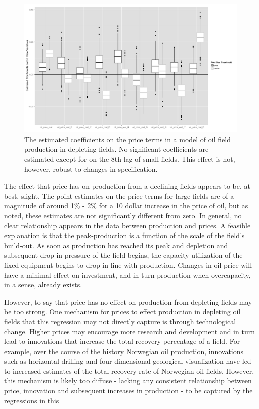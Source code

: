 \documentclass[12pt]{article}
\begin{document}
\begin{figure}
	\includegraphics[width=1\textwidth]{figures/gam_postpeak_print.png}
	\caption{The estimated coefficients on the price terms in a model of oil field production in depleting fields.  No significant coefficients are estimated except for on the 8th lag of small fields.  This effect is not, however, robust to changes in specification.}
	\label{gam_postpeak_print}
\end{figure}

The effect that price has on production from a declining fields appears to be, at best, slight.  The point estimates on the price terms for large fields are of a magnitude of around 1\% - 2\% for a 10 dollar increase in the price of oil, but as noted, these estimates are not significantly different from zero.  In general, no clear relationship appears in the data between production and prices. A feasible explanation is that the peak-production is a function of the scale of the field's build-out.  As soon as production has reached its peak and depletion and subsequent drop in pressure of the field begins, the capacity utilization of the fixed equipment begins to drop in line with production.  Changes in oil price will have a minimal effect on investment, and in turn production when overcapacity, in a sense, already exists.

However, to say that price has no effect on production from depleting fields may be too strong. One mechanism for prices to effect production in depleting oil fields that this regression may not directly capture is through technological change.  Higher prices may encourage more research and development and in turn lead to innovations that increase the total recovery percentage of a field.  For example, over the course of the history Norwegian oil production, innovations such as horizontal drilling and four-dimensional geological visualization have led to increased estimates of the total recovery rate of Norwegian oil fields.  However, this mechanism is likely too diffuse - lacking any consistent relationship between price, innovation and subsequent increases in production - to be captured by the regressions in this 
\end{document}
